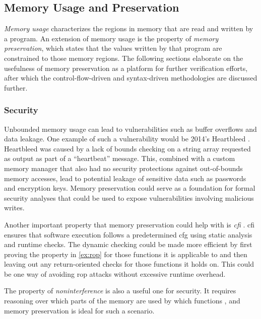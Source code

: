 \subsection{Memory Usage and Preservation}\label{memory_usage}
\emph{Memory usage} characterizes the regions in memory that are read
and written by a program.
An extension of memory usage is the property of \emph{memory preservation},
which states that the values written by that program are constrained
to those memory regions.
The following sections elaborate on the usefulness of memory preservation
as a platform for further verification efforts,
after which the control-flow-driven and syntax-driven methodologies
are discussed further.

\subsubsection{Security}
Unbounded memory usage can lead to vulnerabilities
such as buffer overflows and data leakage.
One example of such a vulnerability would be 2014's Heartbleed \autocite{heartbleed}.
Heartbleed was caused by a lack of bounds checking on a string array
requested as output as part of a ``heartbeat'' message.
This, combined with a custom memory manager
that also had no security protections against out-of-bounds memory accesses,
lead to potential leakage of sensitive data such as passwords and encryption keys.
Memory preservation could serve as a foundation for formal security analyses
that could be used to expose vulnerabilities involving malicious writes.

Another important property that memory preservation could help with
is \emph{\ac{cfi}} \autocite{abadi2009cfi}. \Ac{cfi} ensures that software execution
follows a predetermined \ac{cfg} using static analysis and runtime checks.
The dynamic checking could be made more efficient
by first proving the property in \cref{ex:rop} for those functions it is applicable to
and then leaving out any return-oriented checks for those functions it holds on.
This could be one way of avoiding \ac{rop} attacks without excessive runtime overhead.

The property of \emph{noninterference} is also a useful one for security.
It requires reasoning over which parts of the memory are used by which functions \autocite{rushby1992noninterference},
and memory preservation is ideal for such a scenario.

